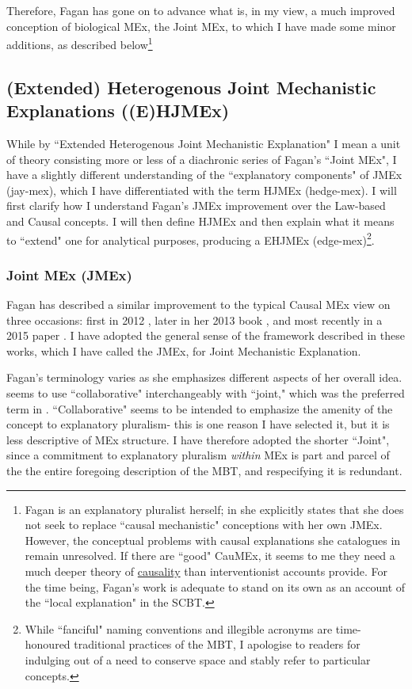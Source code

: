 Therefore, Fagan has gone on to advance what is, in my view, a much improved conception of biological MEx, the Joint MEx, to which I have made some minor additions, as described below\footnote{Fagan is an explanatory pluralist herself; in \cite{Fagan2015} she explicitly states that she does not seek to replace ``causal mechanistic" conceptions with her own JMEx. However, the conceptual problems with causal explanations she catalogues in \cite{Fagan2013} remain unresolved. If there are ``good" CauMEx, it seems to me they need a much deeper theory of \hyperref[causality]{causality} than interventionist accounts provide. For the time being, Fagan's work is adequate to stand on its own as an account of the ``local explanation" in the SCBT.}


\subsection{(Extended) Heterogenous Joint Mechanistic Explanations ((E)HJMEx)}
\label{EHJMEx}

While by ``Extended Heterogenous Joint Mechanistic Explanation" I mean a unit of theory consisting more or less of a diachronic series of Fagan's ``Joint MEx", I have a slightly different understanding of the ``explanatory components" of JMEx (jay-mex), which I have differentiated with the term HJMEx (hedge-mex). I will first clarify how I understand Fagan's JMEx improvement over the Law-based and Causal concepts. I will then define HJMEx and then explain what it means to ``extend" one for analytical purposes, producing a EHJMEx (edge-mex)\footnote{While ``fanciful" naming conventions and illegible acronyms are time-honoured traditional practices of the MBT, I apologise to readers for indulging out of a need to conserve space and stably refer to particular concepts.}.

\subsubsection{Joint MEx (JMEx)}

Fagan has described a similar improvement to the typical Causal MEx view on three occasions: first in 2012 \cite{Fagan2012a}, later in her 2013 book \cite{Fagan2013}, and most recently in a 2015 paper \cite{Fagan2015}. I have adopted the general sense of the framework described in these works, which I have called the JMEx, for Joint Mechanistic Explanation.

 Fagan's terminology varies as she emphasizes different aspects of her overall idea. \cite{Fagan2015} seems to use ``collaborative" interchangeably with ``joint," which was the preferred term in \cite{Fagan2013}. ``Collaborative" seems to be intended to emphasize the amenity of the concept to explanatory pluralism- this is one reason I have selected it, but it is less descriptive of MEx structure. I have therefore adopted the shorter ``Joint", since a commitment to explanatory pluralism \textit{within} MEx is part and parcel of the the entire foregoing description of the MBT, and respecifying it is redundant.

